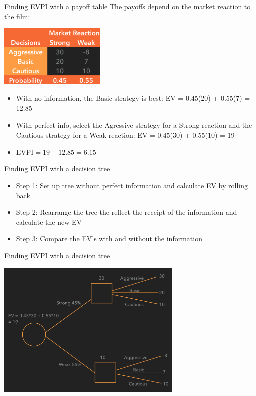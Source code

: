 \documentclass{beamer}\usepackage[]{graphicx}\usepackage[]{color}
\begin{document}
\begin{darkframes}
    \begin{frame}[fragile]{Finding EVPI with a payoff table}
      The payoffs depend on the market reaction to the film:
        \begin{center}
        \includegraphics[width=2in]{BevoPayoffs} 
        \end{center}
        \pause
        \begin{itemize} [<+->]
          \item With no information, the Basic strategy is best: EV = 0.45(20) + 0.55(7) = 12.85
          \item With perfect info, select the Agressive strategy for a Strong reaction and the Cautious strategy for a Weak reaction: EV = 0.45(30) + 0.55(10) = 19
          \item $\text{EVPI} = 19 - 12.85 = 6.15$
        \end{itemize}        
    \end{frame}     



    \begin{frame}[fragile]{Finding EVPI with a decision tree}
          \begin{itemize} [<+->]
            \item Step 1: Set up tree without perfect information and calculate EV by rolling back
            \item Step 2: Rearrange the tree the reflect the receipt of the information and calculate the new EV
            \item Step 3: Compare the EV's with and without the information
          \end{itemize}          

    \end{frame}


    \begin{frame}[fragile]{Finding EVPI with a decision tree}
      \fontsize{10}{10}\selectfont

        \begin{center}
        \includegraphics[width=3.5in]{BevoPerfectInfo} 
        \end{center}
    

\end{frame}
\end{darkframes}
\end{document}
